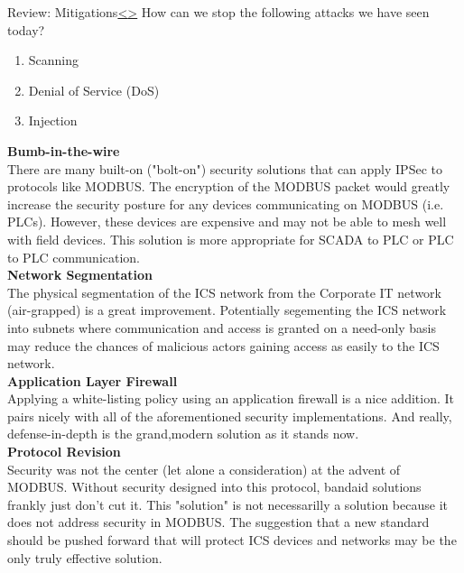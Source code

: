 \documentclass[12pt]{extarticle}
\newenvironment{instructionblock}{\Large\bgroup}{\egroup}
\newcommand{\ben}{\begin{enumerate}}
\newcommand{\een}{\end{enumerate}}
\newcounter{next}
\newcounter{prev}
\begin{document}
\pagebreak
{}
\begin{slide}{Review: Mitigations}{\hyperref[slide \theprev]{\textless}\hyperref[slide \thenext]{\textgreater}}
	\begin{instructionblock}
		How can we stop the following attacks we have seen today?
		\ben
			\item Scanning
			\item Denial of Service (DoS)
			\item Injection
		\een
	\end{instructionblock}
\end{slide}
\vfill
\noindent
\textbf{Bumb-in-the-wire}\\
There are many built-on ("bolt-on") security solutions that can apply IPSec to protocols like MODBUS. The encryption of the MODBUS packet would greatly increase the security posture for any devices communicating on MODBUS (i.e. PLCs). However, these devices are expensive and may not be able to mesh well with field devices. This solution is more appropriate for SCADA to PLC or PLC to PLC communication. \\
\textbf{Network Segmentation}\\
The physical segmentation of the ICS network from the Corporate IT network (air-grapped) is a great improvement. Potentially segementing the ICS network into subnets where communication and access is granted on a need-only basis may reduce the chances of malicious actors gaining access as easily to the ICS network. \\
\textbf{Application Layer Firewall}\\
Applying a white-listing policy using an application firewall is a nice addition. It pairs nicely with all of the aforementioned security implementations. And really, defense-in-depth is the grand,modern solution as it stands now. \\
\textbf{Protocol Revision}\\
Security was not the center (let alone a consideration) at the advent of MODBUS. Without security designed into this protocol, bandaid solutions frankly just don't cut it. This "solution" is not necessarilly a solution because it does not address security in MODBUS. The suggestion that a new standard should be pushed forward that will protect ICS devices and networks may be the only truly effective solution.
\end{document}
